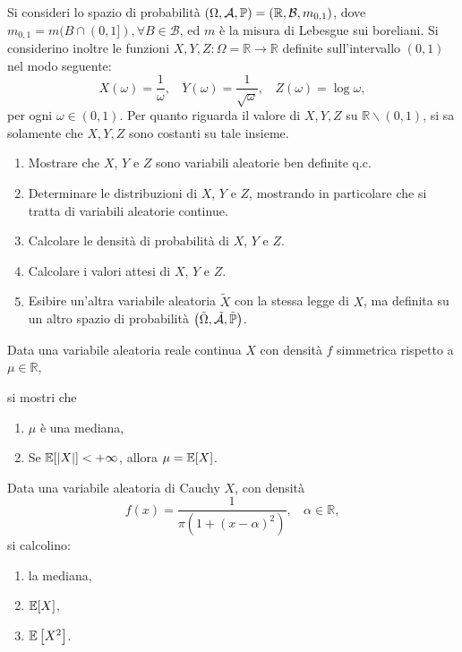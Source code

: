 

\ParteEsercizi
\Esercizio{}

Si consideri lo spazio di probabilità $( \Omega ,\mathcal{A} ,\mathbb{P}) =(\mathbb{R} ,\mathcal{B} ,m_{0,1})$, dove $m_{0,1} =m( B\cap ( 0,1]) ,\forall B\in \mathcal{B}$, ed $m$ è la misura di Lebesgue sui boreliani. Si considerino inoltre le funzioni $X,Y,Z:\Omega =\mathbb{R}\rightarrow \mathbb{R}$ definite sull'intervallo $( 0,1)$ nel modo seguente:
\begin{equation*}
X( \omega ) =\frac{1}{\omega } ,\ \ \ \ Y( \omega ) =\frac{1}{\sqrt{\omega }} ,\ \ \ \ Z( \omega ) =\log \omega ,
\end{equation*}
per ogni $\omega \in ( 0,1)$. Per quanto riguarda il valore di $X,Y,Z$ su $\mathbb{R} \smallsetminus ( 0,1)$, si sa solamente che $X,Y,Z$ sono costanti su tale insieme.
\begin{enumerate}
\item Mostrare che $X$, $Y$ e $Z$ sono variabili aleatorie ben definite q.c.
\item Determinare le distribuzioni di $X$, $Y$ e $Z$, mostrando in particolare che si tratta di variabili aleatorie continue.
\item Calcolare le densità di probabilità di $X$, $Y$ e $Z$.
\item Calcolare i valori attesi di $X$, $Y$ e $Z$.
\item Esibire un'altra variabile aleatoria $\tilde{X}$ con la stessa legge di $X$, ma definita su un altro spazio di probabilità $\left(\tilde{\Omega } ,\tilde{\mathcal{A}} ,\tilde{\mathbb{P}}\right)$.
\end{enumerate}
\Esercizio{}

Data una variabile aleatoria reale continua $X$ con densità $f$ simmetrica rispetto a $\mu \in \mathbb{R}$,

si mostri che
\begin{enumerate}
\item $\mu $ è una mediana,
\item Se $\mathbb{E}[| X| ] < +\infty $, allora $\mu =\mathbb{E}[ X]$.
\end{enumerate}

Data una variabile aleatoria di Cauchy $X$, con densità
\begin{equation*}
f( x) =\frac{1}{\pi \left( 1+( x-\alpha )^{2}\right)} ,\ \ \ \ \alpha \in \mathbb{R} ,
\end{equation*}
si calcolino:
\begin{enumerate}
\item la mediana,
\item $\mathbb{E}[ X]$,
\item $\mathbb{E}\left[ X^{2}\right]$.
\end{enumerate}
\Esercizio{$\star$}

